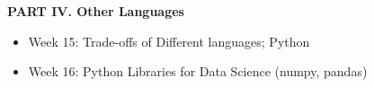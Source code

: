 \documentclass[12pt]{article}
\begin{document}
%
%
%
%

\vspace{.4in}
\begin{center}
	\textbf{PART IV. Other Languages}
\end{center}
\vspace{.2in}

\begin{itemize}
	\item Week 15: Trade-offs of Different languages; Python
	\item Week 16: Python Libraries for Data Science (numpy, pandas)
\end{itemize}
\end{document}
